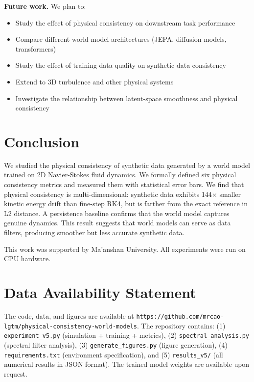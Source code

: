 \documentclass[reprint,aps,pre]{revtex4-2}
\begin{document}
\textbf{Future work.} We plan to:
\begin{itemize}
\item Study the effect of physical consistency on downstream task performance
\item Compare different world model architectures (JEPA, diffusion models, transformers)
\item Study the effect of training data quality on synthetic data consistency
\item Extend to 3D turbulence and other physical systems
\item Investigate the relationship between latent-space smoothness and physical consistency
\end{itemize}

\section{Conclusion}

We studied the physical consistency of synthetic data generated by a world model trained on 2D Navier-Stokes fluid dynamics. We formally defined six physical consistency metrics and measured them with statistical error bars. We find that physical consistency is multi-dimensional: synthetic data exhibits 144$\times$ smaller kinetic energy drift than fine-step RK4, but is farther from the exact reference in L2 distance. A persistence baseline confirms that the world model captures genuine dynamics. This result suggests that world models can serve as data filters, producing smoother but less accurate synthetic data.

\begin{acknowledgments}
This work was supported by Ma'anshan University. All experiments were run on CPU hardware.
\end{acknowledgments}

\section*{Data Availability Statement}
The code, data, and figures are available at \texttt{https://github.com/mrcao-lgtm/physical-consistency-world-models}. The repository contains: (1) \texttt{experiment\_v5.py} (simulation + training + metrics), (2) \texttt{spectral\_analysis.py} (spectral filter analysis), (3) \texttt{generate\_figures.py} (figure generation), (4) \texttt{requirements.txt} (environment specification), and (5) \texttt{results\_v5/} (all numerical results in JSON format). The trained model weights are available upon request.
\end{document}
